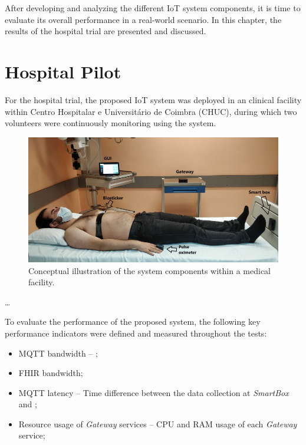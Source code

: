 After developing and analyzing the different \acs{IoT} system components, it is time to evaluate its overall performance in a real-world scenario. In this chapter, the results of the hospital trial are presented and discussed. 

\section{Hospital Pilot}

For the hospital trial, the proposed \acs{IoT} system was deployed in an clinical facility within Centro Hospitalar e Universitário de Coimbra (CHUC), during which two volunteers were continuously monitoring using the system.

\begin{figure}[H]
    \centering
    \includegraphics[width=\linewidth]{images/hospital-trial.png}
    \caption[Conceptual illustration of the system components within a medical facility.]{Conceptual illustration of the system components within a medical facility.}
    \label{fig:hospital-trial}
\end{figure}
\dots

To evaluate the performance of the proposed system, the following key performance indicators were defined and measured throughout the tests:

\begin{itemize}
    \item \acs{MQTT} bandwidth -- ;
    \item \acs{FHIR} bandwidth;
    \item \acs{MQTT} latency -- Time difference between the data collection at \textit{SmartBox} and ;
   
    \item Resource usage of \textit{Gateway} services -- CPU and RAM usage of each \textit{Gateway} service;
\end{itemize}

